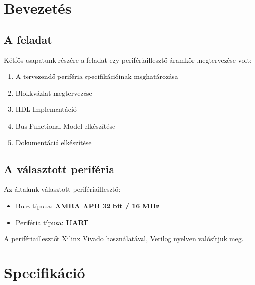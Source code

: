 
\section{Bevezetés}
\subsection{A feladat}
Kétfős csapatunk részére a feladat egy perifériaillesztő áramkör megtervezése volt:
\begin{enumerate}
\item A tervezendő periféria specifikációinak meghatározása
\item Blokkvázlat megtervezése
\item HDL Implementáció
\item Bus Functional Model elkészítése
\item Dokumentáció elkészítése

\end{enumerate}
\subsection{A választott periféria}
Az általunk választott perifériaillesztő:
\begin{itemize}
\item Busz típusa: \textbf{AMBA APB 32 bit / 16 MHz}
\item Periféria típusa: \textbf{UART}
\end{itemize}

A perifériaillesztőt Xilinx Vivado használatával, Verilog nyelven valósítjuk meg.
\newpage
\section{Specifikáció}

